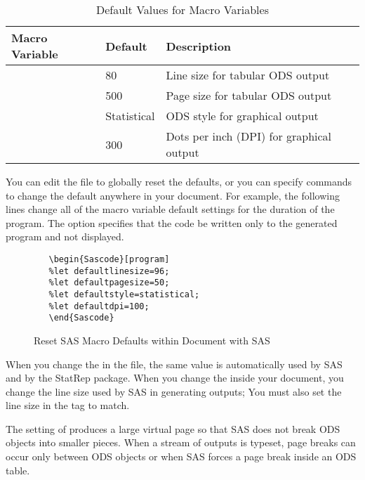 \documentclass[article,oneside]{memoir}
\newcommand*{\StatRep}{\textsf{StatRep}\xspace}
\begin{document}
  \begin{table}[H]
  \centering\caption{Default Values for Macro Variables}\label{defaults}
  \begin{tabular}{llP{2.5in}}
  \textbf{Macro Variable}    & \textbf{Default} & \textbf{Description}\\
  \hline
      & 80      & Line size for tabular ODS output\\
      & 500     & Page size for tabular ODS output\\
         & Statistical & ODS style for graphical output \\
           & 300      & Dots per inch (DPI) for graphical output\\
  \hline
   \end{tabular}
  \end{table}
  
  You can edit the  file
  to globally reset the defaults, or you can specify commands to change the default anywhere
  in your document. For example, the following lines change all of the macro variable 
  default settings for the duration of the program. The  option specifies
  that the code be written only to the generated program and not displayed.
  

\begin{figure}[H]
\begin{snugshade}
\begin{verbatim}
   \begin{Sascode}[program]
   %let defaultlinesize=96;
   %let defaultpagesize=50;
   %let defaultstyle=statistical;
   %let defaultdpi=100;
   \end{Sascode}
\end{verbatim}
\end{snugshade}
\caption{Reset SAS Macro Defaults within Document with SAS}\label{reset}
\end{figure}
  
  When you change the  in the  file, the same value
  is automatically used by SAS and by the \StatRep package.
  When you change the  inside your document, 
  you change the line size used by SAS in generating
  outputs; You must also set the line size in the  tag to match.
  
  The setting of  produces a large
  virtual page so that SAS does not break ODS objects into smaller pieces. 
  When a stream of outputs is typeset, page breaks can occur only between ODS objects or
  when SAS forces a page break inside an ODS table. 
  
\end{document}
